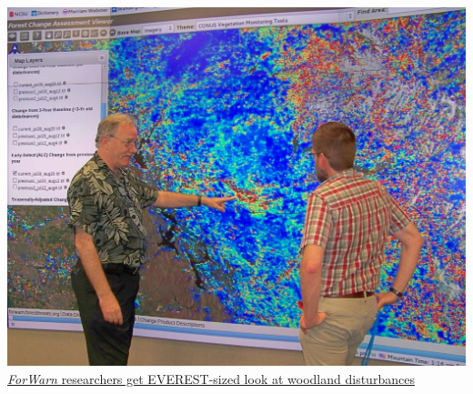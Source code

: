 \begin{frame}\small
 \begin{center}
  \includegraphics[width=\textwidth]{figures/Hargrove_and_Hoffman_study_the_effects_of_the_growing_Rim_fire_in_California_on_EVEREST_20130823.jpg} \\
  \href{http://www.ornl.gov/ornl/news/features/2013/forwarn-researchers-get-everest-sized-look-at-woodland-disturbances}{\textit{ForWarn} researchers get EVEREST-sized look at woodland disturbances}
 \end{center}
\end{frame}

